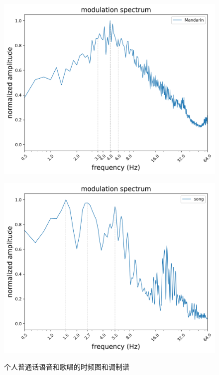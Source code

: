 \documentclass[jou,12pt,floatsintext]{apa7} %
\begin{document}
\begin{figure}[!htb]
    \begin{minipage}{0.49\textwidth}
        \centering
        \subcaption{}
        \vspace{-0.5em}
        \includegraphics[width=\textwidth]{figure/spectrum_shuohua.png}
        \label{spectrum:shuohua}
    \end{minipage}
    \begin{minipage}{0.49\textwidth}
        \centering
        \subcaption{}
        \vspace{-0.5em}
        \includegraphics[width=\textwidth]{figure/spectrum_song.png}
        \label{spectrum:song}
    \end{minipage}
    
    \captionsetup{labelsep=period}
    \vspace{-1em}
    \caption{\small 个人普通话语音和歌唱的时频图和调制谱}
    
    \label{fig:fig1}
\end{figure}
\end{document}
